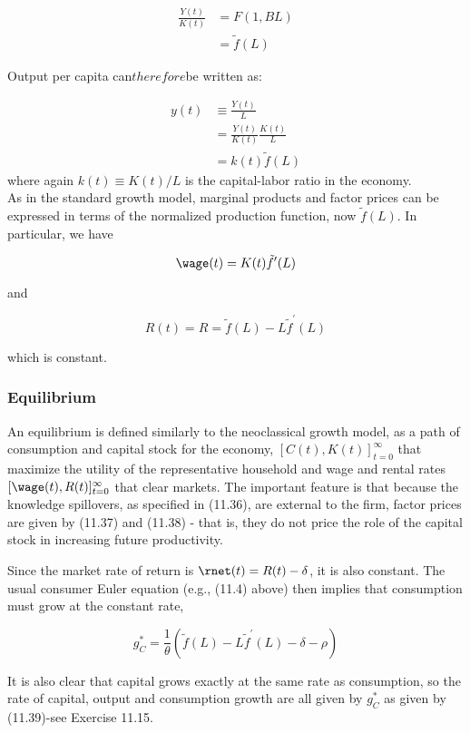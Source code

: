 \documentclass[\topdir/lecture\_notes.tex]{subfiles}
\begin{document}
\[
\begin{aligned}
\frac{Y(t)}{K(t)} & =F(1, B L) \\
& =\tilde{f}(L)
\end{aligned}
\]

Output per capita can$ therefore $be written as:

\[
\begin{aligned}
y(t) & \equiv \frac{Y(t)}{L} \\
& =\frac{Y(t)}{K(t)} \frac{K(t)}{L} \\
& =k(t) \tilde{f}(L)
\end{aligned}
\]
 where again $k(t) \equiv K(t) / L$ is the capital-labor ratio in the economy.\\
As in the standard growth model, marginal products and factor prices can be expressed in terms of the normalized production function, now $\tilde{f}(L)$. In particular, we have

\[
\wage(t)=K(t) \tilde{f}^{\prime}(L)
\]

and

\[
R(t)=R=\tilde{f}(L)-L \tilde{f}^{\prime}(L)
\]

which is constant.\\
\subsubsection{Equilibrium}
An equilibrium is defined similarly to the neoclassical growth model, as a path of consumption and capital stock for the economy, $[C(t), K(t)]_{t=0}^{\infty}$ that maximize the utility of the representative household and wage and rental rates $[\wage(t), R(t)]_{t=0}^{\infty}$ that clear markets. The important feature is that because the knowledge spillovers, as specified in (11.36), are external to the firm, factor prices are given by (11.37) and (11.38) - that is, they do not price the role of the capital stock in increasing future productivity.

Since the market rate of return is $\rnet(t)=R(t)-\delta$, it is also constant. The usual consumer Euler equation (e.g., (11.4) above) then implies that consumption must grow at the constant rate,

\[
g_{C}^{*}=\frac{1}{\theta}\left(\tilde{f}(L)-L \tilde{f}^{\prime}(L)-\delta-\rho\right)
\]

It is also clear that capital grows exactly at the same rate as consumption, so the rate of capital, output and consumption growth are all given by $g_{C}^{*}$ as given by (11.39)-see Exercise 11.15.
\end{document}

